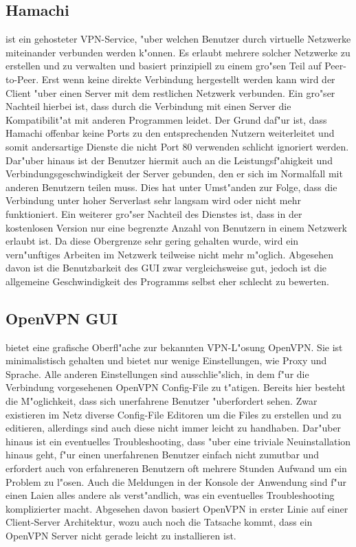 \documentclass[a4paper,12pt]{scrreprt}
\begin{document}
	\subsection{Hamachi} ist ein gehosteter VPN-Service, "uber welchen Benutzer durch virtuelle Netzwerke miteinander verbunden werden k"onnen. Es erlaubt mehrere solcher Netzwerke zu erstellen und zu verwalten und basiert prinzipiell zu einem gro"sen Teil auf Peer-to-Peer. Erst wenn keine direkte Verbindung hergestellt werden kann wird der Client "uber einen Server mit dem restlichen Netzwerk verbunden. Ein gro"ser Nachteil hierbei ist, dass durch die Verbindung mit einen Server die Kompatibilit"at mit anderen Programmen leidet. Der Grund daf"ur ist, dass Hamachi offenbar keine Ports zu den entsprechenden Nutzern weiterleitet und somit andersartige Dienste die nicht Port 80 verwenden schlicht ignoriert werden. Dar"uber hinaus ist der Benutzer hiermit auch an die Leistungsf"ahigkeit und Verbindungsgeschwindigkeit der Server gebunden, den er sich im Normalfall mit anderen Benutzern teilen muss. Dies hat unter Umst"anden zur Folge, dass die Verbindung unter hoher Serverlast sehr langsam wird oder nicht mehr funktioniert. Ein weiterer gro"ser Nachteil des Dienstes ist, dass in der kostenlosen Version  nur eine begrenzte Anzahl von Benutzern in einem Netzwerk erlaubt ist. Da diese Obergrenze sehr gering gehalten wurde, wird ein vern"unftiges Arbeiten im Netzwerk teilweise nicht mehr m"oglich. Abgesehen davon ist die Benutzbarkeit des GUI zwar vergleichsweise gut, jedoch ist die allgemeine Geschwindigkeit des Programms selbst eher schlecht zu bewerten. 
	
	\subsection{OpenVPN GUI} bietet eine grafische Oberfl"ache zur bekannten VPN-L"osung OpenVPN. Sie ist minimalistisch gehalten und bietet nur wenige Einstellungen, wie Proxy und Sprache. Alle anderen Einstellungen sind ausschlie"slich, in dem f"ur die Verbindung vorgesehenen OpenVPN Config-File zu t"atigen. Bereits hier besteht die M"oglichkeit, dass sich unerfahrene Benutzer  "uberfordert sehen. Zwar existieren im Netz diverse Config-File Editoren um die Files zu erstellen und zu editieren, allerdings sind auch diese nicht immer leicht zu handhaben. Dar"uber hinaus ist ein eventuelles Troubleshooting, dass "uber eine triviale Neuinstallation hinaus geht, f"ur einen unerfahrenen Benutzer einfach nicht zumutbar und erfordert auch von erfahreneren Benutzern oft mehrere Stunden Aufwand um ein Problem zu l"osen. Auch die Meldungen in der Konsole der Anwendung sind f"ur einen Laien alles andere als verst"andlich, was ein eventuelles Troubleshooting komplizierter macht. Abgesehen davon basiert OpenVPN in erster Linie auf einer Client-Server Architektur, wozu auch noch die Tatsache kommt, dass ein OpenVPN Server nicht gerade leicht zu installieren ist.
	
\end{document}
